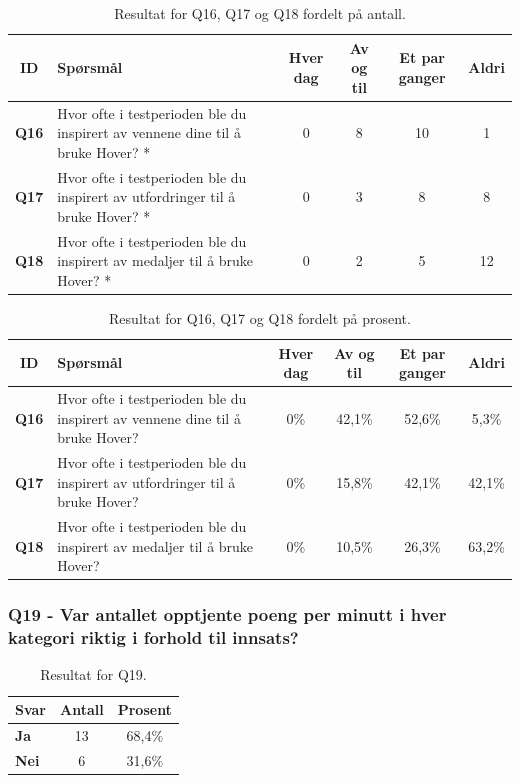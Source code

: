 \begin{table}[H]     
\small
    \centering
    \begin{tabularx}{\textwidth}{|>{\bfseries}c|X|c|c|c|c|}
        \hline \textbf{ID} & \textbf{Spørsmål} & \textbf{Hver dag}  &  \textbf{Av og til}  &  \textbf{Et par ganger}  &  \textbf{Aldri}  \\ \hline
        \textbf{Q16} & Hvor ofte i testperioden ble du inspirert av vennene dine til å bruke Hover? * & 0 & 8 & 10 & 1 \\ 
        \textbf{Q17} & Hvor ofte i testperioden ble du inspirert av utfordringer til å bruke Hover? * & 0 & 3 & 8 & 8 \\ 
        \textbf{Q18} & Hvor ofte i testperioden ble du inspirert av medaljer til å bruke Hover? * & 0 & 2 & 5 & 12 \\
         \hline
    \end{tabularx}
    \caption{Resultat for Q16, Q17 og Q18 fordelt på antall.}
\end{table}


\begin{table}[H]     \small
    \centering
    \begin{tabularx}{\textwidth}{|>{\bfseries}c|X|c|c|c|c|}
        \hline \textbf{ID} & \textbf{Spørsmål} & \textbf{Hver dag}  &  \textbf{Av og til}  &  \textbf{Et par ganger}  &  \textbf{Aldri}  \\ \hline
        \textbf{Q16} & Hvor ofte i testperioden ble du inspirert av vennene dine til å bruke Hover? & 0\% & 42,1\% & 52,6\% & 5,3\% \\ 
        \textbf{Q17} & Hvor ofte i testperioden ble du inspirert av utfordringer til å bruke Hover? & 0\% & 15,8\% & 42,1\% & 42,1\% \\ 
        \textbf{Q18} & Hvor ofte i testperioden ble du inspirert av medaljer til å bruke Hover? & 0\% & 10,5\% & 26,3\% & 63,2\% \\
         \hline
    \end{tabularx}
    \caption{Resultat for Q16, Q17 og Q18 fordelt på prosent.}
\end{table}

\subsubsection*{Q19 - Var antallet opptjente poeng per minutt i hver kategori riktig i forhold til innsats?}
\begin{table}[H]     \small
    \centering
    \begin{tabularx}{0.4\textwidth}{|>{\bfseries}X|c|c|}
       \hline\textbf{Svar}  & \textbf{Antall} & \textbf{Prosent}  \\  \hline
        Ja & 13 & 68,4\%  \\ 
        Nei & 6 & 31,6\% \\
         \hline
    \end{tabularx}
    \caption{Resultat for Q19.}
\end{table}

